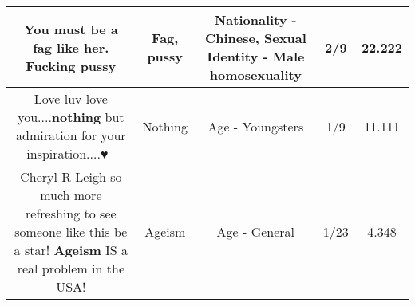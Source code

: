 \documentclass[11pt]{article}
\newlength\mylength
\begin{document}
\begin{center}
\begin{longtable}{|C{.65\mylength}|C{.30\mylength}|C{.12\mylength}|C{.12\mylength}|C{.12\mylength}|}
  \small You must be a \textbf{fag} like her. Fucking pussy\normalsize   & Fag, pussy & Nationality - Chinese, Sexual Identity - Male homosexuality & 2/9 & 22.222 \\  \hline
  \small Love luv love you....\textbf{nothing} but admiration for your inspiration....♥️🥰😘\normalsize   & Nothing & Age - Youngsters & 1/9 & 11.111 \\  \hline
  \small Cheryl R Leigh so much more refreshing to see someone like this be a star! \textbf{Ageism} IS a real problem in the USA!\normalsize   & Ageism & Age - General & 1/23 & 4.348 \\  \hline
  
\end{longtable}
\end{center}
\end{document}
